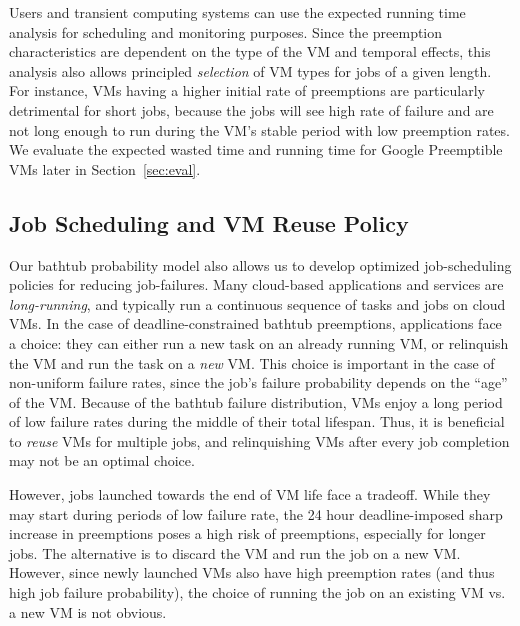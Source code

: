 \documentclass[sigconf]{acmart} %
\newcommand{\subsecspace}[0]{-0.20cm}
\begin{document}
Users and transient computing systems can use the expected running time analysis for scheduling and monitoring purposes.
Since the preemption characteristics are dependent on the type of the VM and temporal effects, this analysis also allows principled \emph{selection} of VM types for jobs of a given length. 
For instance, VMs having a higher initial rate of preemptions are particularly detrimental for short jobs, because the jobs will see high rate of failure and are not long enough to run during the VM's stable period with low  preemption rates. 
We evaluate the expected wasted time and running time for Google Preemptible VMs later in Section~\ref{sec:eval}. 

\vspace*{\subsecspace}
\subsection{Job Scheduling and VM Reuse Policy}

Our bathtub probability model also allows us to develop optimized job-scheduling policies for reducing  job-failures.
Many cloud-based applications and services are \emph{long-running}, and typically run a continuous sequence of tasks and jobs on cloud VMs. 
In the case of deadline-constrained bathtub preemptions, applications face a choice: they can either run a new task on an already running VM, or relinquish the VM and run the task on a \emph{new} VM. 
This choice is important in the case of non-uniform failure rates, since the job's failure probability depends on the ``age'' of the VM. 
Because of the bathtub failure distribution, VMs enjoy a long period of low failure rates during the middle of their total lifespan.
Thus, it is beneficial to \emph{reuse} VMs for multiple jobs, and relinquishing VMs after every job completion may not be an optimal choice. 

However, jobs launched towards the end of VM life face a tradeoff.
While they may start during periods of low failure rate, the 24 hour deadline-imposed sharp increase in preemptions poses a high risk of preemptions, especially for longer jobs.
The alternative is to discard the VM and run the job on a new VM. 
However, since newly launched VMs also have high preemption rates (and thus high job failure probability), the choice of running the job on an existing VM vs. a new VM is not obvious. 
\end{document}

